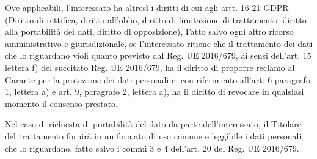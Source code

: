 \documentclass[legalpaper, 11pt]{exam}
\let\tempone\enumerate
\let\temptwo\endenumerate
\renewenvironment{enumerate}{\tempone\addtolength{\itemsep}{-0.45\baselineskip}}{\temptwo}
\begin{document}
{\begin{enumerate}
 \end{enumerate}
Ove applicabili, l’interessato ha altresì i diritti di cui agli artt. 16-21 GDPR (Diritto di rettifica, diritto all’oblio, diritto di limitazione di trattamento, diritto alla portabilità dei dati, diritto di opposizione),
Fatto salvo ogni altro ricorso amministrativo e giurisdizionale, se l’interessato ritiene che il trattamento dei dati che lo riguardano violi quanto previsto dal Reg. UE 2016/679, ai sensi dell’art. 15 lettera f) del succitato Reg. UE 2016/679, ha il diritto di proporre reclamo al Garante per la protezione dei dati personali e, con riferimento all’art. 6 paragrafo 1, lettera a) e art. 9, paragrafo 2, lettera a), ha il diritto di revocare in qualsiasi momento il consenso prestato.

Nel caso di richiesta di portabilità del dato da parte dell’interessato, il Titolare del trattamento fornirà in un formato di uso comune e leggibile i dati personali che lo riguardano, fatto salvo i commi 3 e 4 dell’art. 20 del Reg. UE 2016/679.
}
\end{document}

